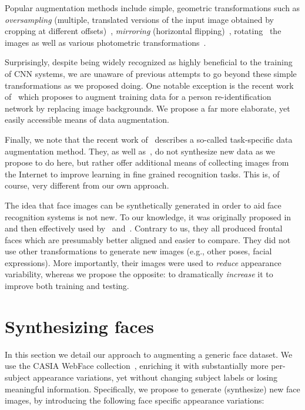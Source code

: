 \documentclass[runningheads]{llncs}
\newcommand{\minisection}[1]{\vspace{0.04in} \noindent {\bf #1:} }
\begin{document}
Popular augmentation methods include simple, geometric transformations such as {\em oversampling} (multiple, translated versions of the input image obtained by cropping at different offsets)~\cite{krizhevsky2012imagenet,LH:CVPRw15:age}, {\em mirroring} (horizontal flipping)~\cite{Chatfield14,yang2015mirror}, rotating~\cite{Xie2015Holistically} the images as well as various photometric transformations~\cite{krizhevsky2012imagenet,Simonyan2015very,eigen2015predicting}.

Surprisingly, despite being widely recognized as highly beneficial to the training of CNN systems, we are unaware of previous attempts to go beyond these simple transformations as we proposed doing. One notable exception is the recent work of~\cite{mclaughlin2015data} which proposes to augment training data for a person re-identification network by replacing image backgrounds. We propose a far more elaborate, yet easily accessible means of data augmentation.

Finally, we note that the recent work of~\cite{xie2015hyper} describes a so-called task-specific data augmentation method. They, as well as~\cite{xu2015augmenting}, do not synthesize new data as we propose to do here, but rather offer additional means of collecting images from the Internet to improve learning in fine grained recognition tasks. This is, of course, very different from our own approach.


\minisection{Face synthesis for face recognition} 
The idea that face images can be synthetically generated in order to aid face recognition systems is not new. To our knowledge, it was originally proposed in~\cite{hassner2013viewing} and then effectively used by~\cite{taigman2014deepface} and~\cite{hassner2015effective}. Contrary to us, they all produced frontal faces which are presumably better aligned and easier to compare. They did not use other transformations to generate new images (e.g., other poses, facial expressions). More importantly, their images were used to {\em reduce} appearance variability, whereas we propose the opposite: to dramatically {\em increase} it to improve both training and testing.


\section{Synthesizing faces}\label{sec:system}
In this section we detail our approach to augmenting a generic face dataset. We use the CASIA WebFace collection~\cite{yi2014learning}, enriching it with substantially more per-subject appearance variations, yet without changing subject labels or losing meaningful information. Specifically, we propose to generate (synthesize) new face images, by introducing the following face specific appearance variations:
\end{document}
